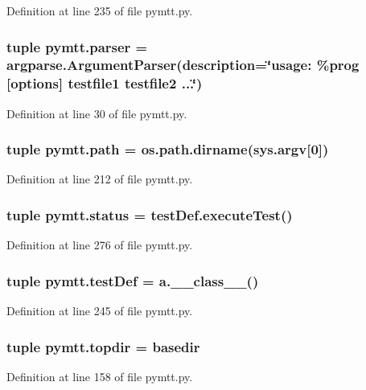 Definition at line 235 of file pymtt.\-py.

\hypertarget{namespacepymtt_a95d54fdad48aac280be9d57cf81dee68}{
\subsubsection[{parser}]{\setlength{\rightskip}{0pt plus 5cm}tuple pymtt.\-parser = argparse.\-Argument\-Parser(description=\char`\"{}usage\-: \%prog \mbox{[}options\mbox{]} testfile1 testfile2 ...\char`\"{})}}\label{namespacepymtt_a95d54fdad48aac280be9d57cf81dee68}


Definition at line 30 of file pymtt.\-py.

\hypertarget{namespacepymtt_a79ea4ff472e24c5d543c6a30968b21e6}{
\subsubsection[{path}]{\setlength{\rightskip}{0pt plus 5cm}tuple pymtt.\-path = os.\-path.\-dirname(sys.\-argv\mbox{[}0\mbox{]})}}\label{namespacepymtt_a79ea4ff472e24c5d543c6a30968b21e6}


Definition at line 212 of file pymtt.\-py.

\hypertarget{namespacepymtt_a7ab538ba889839f62b313c79930d4575}{
\subsubsection[{status}]{\setlength{\rightskip}{0pt plus 5cm}tuple pymtt.\-status = test\-Def.\-execute\-Test()}}\label{namespacepymtt_a7ab538ba889839f62b313c79930d4575}


Definition at line 276 of file pymtt.\-py.

\hypertarget{namespacepymtt_afebe539e6104da8ebd3d06b7a0e77fe7}{
\subsubsection[{test\-Def}]{\setlength{\rightskip}{0pt plus 5cm}tuple pymtt.\-test\-Def = a.\-\_\-\-\_\-class\-\_\-\-\_\-()}}\label{namespacepymtt_afebe539e6104da8ebd3d06b7a0e77fe7}


Definition at line 245 of file pymtt.\-py.

\hypertarget{namespacepymtt_ac564eaf8be3f93d5dd5703b3d919902b}{
\subsubsection[{topdir}]{\setlength{\rightskip}{0pt plus 5cm}tuple pymtt.\-topdir = {\bf basedir}}}\label{namespacepymtt_ac564eaf8be3f93d5dd5703b3d919902b}


Definition at line 158 of file pymtt.\-py.

